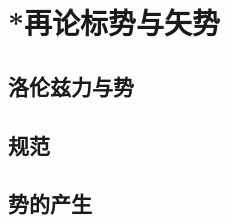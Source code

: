 

\section{*再论标势与矢势}\label{19-4}

\subsection{洛伦兹力与势}\label{19-4-1}

\subsection{规范}\label{19-4-2}

\subsection{势的产生}\label{19-4-3}
